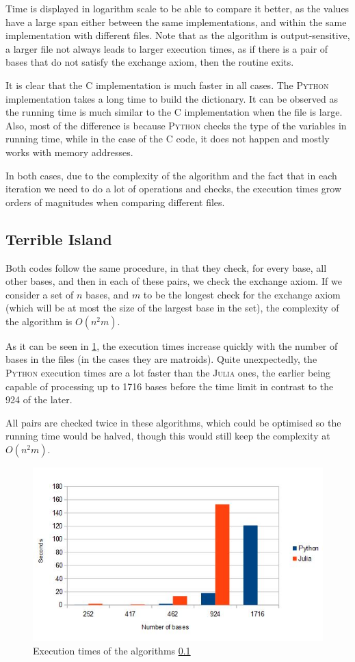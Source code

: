 \documentclass[11pt]{amsart}
\begin{document}
Time is displayed in logarithm scale to be able to compare it better,
as the values have a large span either between the same implementations,
and within the same implementation with different files.
Note that as the algorithm is output-sensitive,
a larger file not always leads to larger execution times,
as if there is a pair of bases that do not satisfy the exchange axiom,
then the routine exits.

It is clear that the \textsc{C} implementation is much faster in all cases.
The \textsc{Python} implementation takes a long time to build the dictionary.
It can be observed as the running time is much similar to the
\textsc{C} implementation when the file is large.
Also, most of the difference is because \textsc{Python} checks the type
of the variables in running time,
while in the case of the \textsc{C} code,
it does not happen and mostly works with memory addresses.

In both cases,
due to the complexity of the algorithm
and the fact that in each iteration we need to do a lot of operations and checks,
the execution times grow orders of magnitudes when comparing different files.

\subsection{Terrible Island}
\label{terribleisland}

Both codes follow the same procedure, in that they check, for every base, all other bases, and then in each of these pairs, we check the exchange axiom. If we consider a set of $n$ bases, and $m$ to be the longest check for the exchange axiom (which will be at most the size of the largest base in the set), the complexity of the algorithm is $O(n^{2}m)$.

As it can be seen in \ref{figureterribleisland}, the execution times increase quickly with the number of bases in the files (in the cases they are matroids). Quite unexpectedly, the \textsc{Python} execution times are a lot faster than the \textsc{Julia} ones, the earlier being capable of processing up to 1716 bases before the time limit in contrast to the 924 of the later.

All pairs are checked twice in these algorithms, which could be optimised so the running time would be halved, though this would still keep the complexity at $O(n^{2}m)$.

\begin{figure}[h!]
	\centering
	\includegraphics[width=.7\textwidth]{./Terrible-Island/times.jpeg}
	\caption{Execution times of the algorithms \ref{terribleisland}}
	\label{figureterribleisland}
\end{figure}
\end{document}
